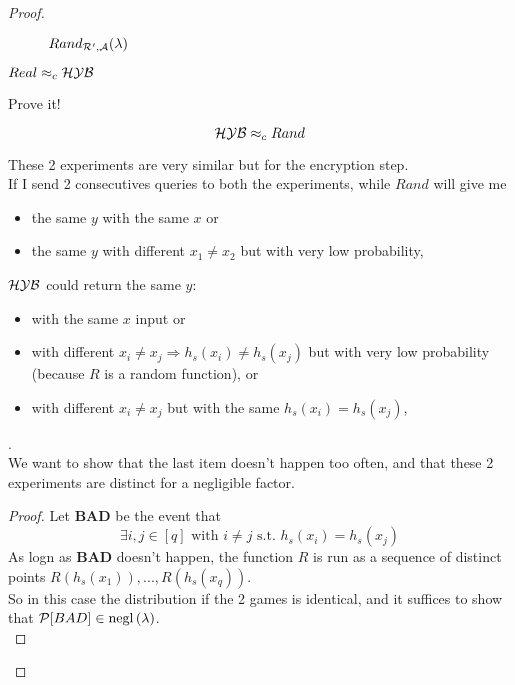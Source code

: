 \begin{proof}
\begin{figure}[h!]
   \caption{$Rand_{\mathcal{R}', \mathcal{A}}(\lambda)$}
\end{figure}

\begin{lemma}
    
    $Real \approx_{c} \mathcal{H}\mathcal{Y}\mathcal{B}$

\end{lemma}
\begin{exercise}
    Prove it!
\end{exercise}

\begin{lemma}
    \[
       \mathcal{H}\mathcal{Y}\mathcal{B} \approx_{c} Rand 
    \]
\end{lemma}
These 2 experiments are very similar but for the encryption step.\\
If I send 2 consecutives queries to both the experiments, while $Rand$ will
give me 
\begin{itemize}
    \item the same $y$ with the same $x$ or 
    \item the same $y$ with different $x_{1}\not=x_{2}$ but with very low probability, 
\end{itemize}
$\mathcal{H}\mathcal{Y}\mathcal{B}$ could return the same $y$:
\begin{itemize}
    \item with the same $x$ input or
    \item with different $x_{i}\not=x_{j} \Rightarrow h_{s}(x_{i}) 
        \not= h_{s}(x_{j})$ but with very low
        probability (because $R$ is a random function), or
    \item with different $x_{i}\not= x_{j}$ but with the same
        $h_{s}(x_{i})=h_{s}(x_{j})$,
\end{itemize}.\\
We want to show that the last item doesn't happen too often, and that these 2
experiments are distinct for a negligible factor.\\

\begin{proof}
    Let \textbf{BAD}  be the event that
    \[
        \exists i, j \in [q] \text{ with } i\not= j \text{ s.t. }
        h_{s}(x_{i})=h_{s}(x_{j})
    \]
    As logn as \textbf{BAD} doesn't happen, the function $R$ is run as a
    sequence of distinct points $R(h_{s}(x_{1})), ..., R(h_{s}(x_{q}))$.\\
    So in this case the distribution if the 2 games is identical, and it
    suffices to show that $ \mathcal{P} [ BAD ] \in \mathrm{negl}\left({\lambda}\right)  $.\\


\end{proof}
\end{proof}
